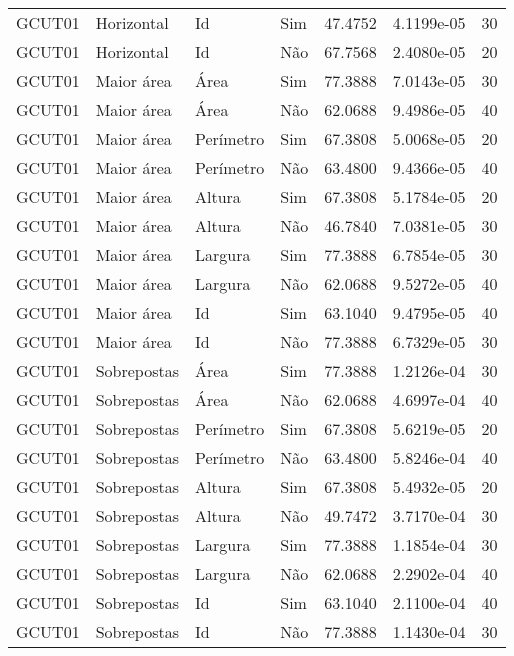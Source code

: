 \begin{tabular}{llllrrr}
    GCUT01    & Horizontal  & Id        & Sim         & 47.4752      & 4.1199e-05 & 30       \\
    GCUT01    & Horizontal  & Id        & Não         & 67.7568      & 2.4080e-05 & 20       \\
    GCUT01    & Maior área  & Área      & Sim         & 77.3888      & 7.0143e-05 & 30       \\
    GCUT01    & Maior área  & Área      & Não         & 62.0688      & 9.4986e-05 & 40       \\
    GCUT01    & Maior área  & Perímetro & Sim         & 67.3808      & 5.0068e-05 & 20       \\
    GCUT01    & Maior área  & Perímetro & Não         & 63.4800      & 9.4366e-05 & 40       \\
    GCUT01    & Maior área  & Altura    & Sim         & 67.3808      & 5.1784e-05 & 20       \\
    GCUT01    & Maior área  & Altura    & Não         & 46.7840      & 7.0381e-05 & 30       \\
    GCUT01    & Maior área  & Largura   & Sim         & 77.3888      & 6.7854e-05 & 30       \\
    GCUT01    & Maior área  & Largura   & Não         & 62.0688      & 9.5272e-05 & 40       \\
    GCUT01    & Maior área  & Id        & Sim         & 63.1040      & 9.4795e-05 & 40       \\
    GCUT01    & Maior área  & Id        & Não         & 77.3888      & 6.7329e-05 & 30       \\
    GCUT01    & Sobrepostas & Área      & Sim         & 77.3888      & 1.2126e-04 & 30       \\
    GCUT01    & Sobrepostas & Área      & Não         & 62.0688      & 4.6997e-04 & 40       \\
    GCUT01    & Sobrepostas & Perímetro & Sim         & 67.3808      & 5.6219e-05 & 20       \\
    GCUT01    & Sobrepostas & Perímetro & Não         & 63.4800      & 5.8246e-04 & 40       \\
    GCUT01    & Sobrepostas & Altura    & Sim         & 67.3808      & 5.4932e-05 & 20       \\
    GCUT01    & Sobrepostas & Altura    & Não         & 49.7472      & 3.7170e-04 & 30       \\
    GCUT01    & Sobrepostas & Largura   & Sim         & 77.3888      & 1.1854e-04 & 30       \\
    GCUT01    & Sobrepostas & Largura   & Não         & 62.0688      & 2.2902e-04 & 40       \\
    GCUT01    & Sobrepostas & Id        & Sim         & 63.1040      & 2.1100e-04 & 40       \\
    GCUT01    & Sobrepostas & Id        & Não         & 77.3888      & 1.1430e-04 & 30       \\
    \hline
\end{tabular}